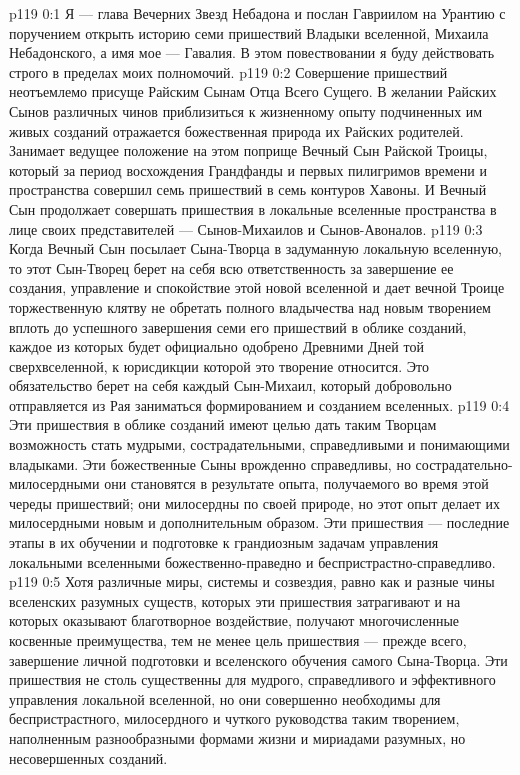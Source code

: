 \author{Глава Вечерних Звезд}
\vs p119 0:1 Я --- глава Вечерних Звезд Небадона и послан Гавриилом на Урантию с поручением открыть историю семи пришествий Владыки вселенной, Михаила Небадонского, а имя мое --- Гавалия. В этом повествовании я буду действовать строго в пределах моих полномочий.
\vs p119 0:2 \pc Совершение пришествий неотъемлемо присуще Райским Сынам Отца Всего Сущего. В желании Райских Сынов различных чинов приблизиться к жизненному опыту подчиненных им живых созданий отражается божественная природа их Райских родителей. Занимает ведущее положение на этом поприще Вечный Сын Райской Троицы, который за период восхождения Грандфанды и первых пилигримов времени и пространства совершил семь пришествий в семь контуров Хавоны. И Вечный Сын продолжает совершать пришествия в локальные вселенные пространства в лице своих представителей --- Сынов\hyp{}Михаилов и Сынов\hyp{}Авоналов.
\vs p119 0:3 Когда Вечный Сын посылает Сына\hyp{}Творца в задуманную локальную вселенную, то этот Сын\hyp{}Творец берет на себя всю ответственность за завершение ее создания, управление и спокойствие этой новой вселенной и дает вечной Троице торжественную клятву не обретать полного владычества над новым творением вплоть до успешного завершения семи его пришествий в облике созданий, каждое из которых будет официально одобрено Древними Дней той сверхвселенной, к юрисдикции которой это творение относится. Это обязательство берет на себя каждый Сын\hyp{}Михаил, который добровольно отправляется из Рая заниматься формированием и созданием вселенных.
\vs p119 0:4 Эти пришествия в облике созданий имеют целью дать таким Творцам возможность стать мудрыми, сострадательными, справедливыми и понимающими владыками. Эти божественные Сыны врожденно справедливы, но сострадательно\hyp{}милосердными они становятся в результате опыта, получаемого во время этой череды пришествий; они милосердны по своей природе, но этот опыт делает их милосердными новым и дополнительным образом. Эти пришествия --- последние этапы в их обучении и подготовке к грандиозным задачам управления локальными вселенными божественно\hyp{}праведно и беспристрастно\hyp{}справедливо.
\vs p119 0:5 Хотя различные миры, системы и созвездия, равно как и разные чины вселенских разумных существ, которых эти пришествия затрагивают и на которых оказывают благотворное воздействие, получают многочисленные косвенные преимущества, тем не менее цель пришествия --- прежде всего, завершение личной подготовки и вселенского обучения самого Сына\hyp{}Творца. Эти пришествия не столь существенны для мудрого, справедливого и эффективного управления локальной вселенной, но они совершенно необходимы для беспристрастного, милосердного и чуткого руководства таким творением, наполненным разнообразными формами жизни и мириадами разумных, но несовершенных созданий.
